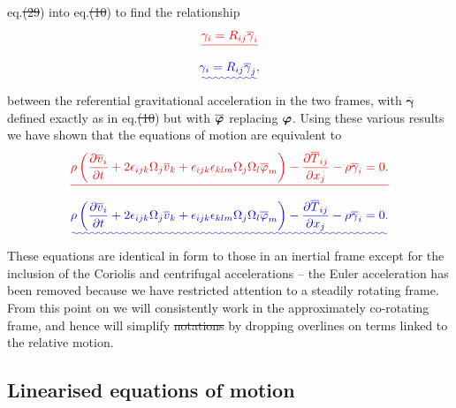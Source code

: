\documentclass[a4paper,12pt]{paper}
\providecommand{\DIFadd}[1]{{\protect\color{blue}\uwave{#1}}} %
\providecommand{\DIFdel}[1]{{\protect\color{red}\sout{#1}}}                      %
\providecommand{\DIFaddbegin}{} %
\providecommand{\DIFaddend}{} %
\providecommand{\DIFdelbegin}{} %
\providecommand{\DIFdelend}{} %
\begin{document}
eq.\DIFdelbegin \DIFdel{(29}\DIFdelend \DIFaddbegin \DIFadd{~(\ref{eq:29}}\DIFaddend ) into eq.\DIFdelbegin \DIFdel{(10}\DIFdelend \DIFaddbegin \DIFadd{~(\ref{eq:10}}\DIFaddend ) to find the relationship
\DIFdelbegin \begin{displaymath}
\DIFdel{\gamma_{i}=R_{ij}\overline{\gamma}_{i}
}\end{displaymath}%
\DIFdelend \DIFaddbegin \begin{equation}
\DIFadd{\gamma_{i}=R_{ij}\overline{\gamma}_{j},
\label{eq:39}
}\end{equation}\DIFaddend 
between the referential gravitational acceleration in the two frames, with \DIFdelbegin \DIFdel{$\overline{\boldsymbol{\gamma}}$ }\DIFdelend \DIFaddbegin \DIFadd{$\overline{\bm{\gamma}}$ }\DIFaddend defined 
exactly as in eq.\DIFdelbegin \DIFdel{(10}\DIFdelend \DIFaddbegin \DIFadd{~(\ref{eq:10}}\DIFaddend ) but with $\overline{\bm{\varphi}}$ replacing $\bm{\varphi}$. Using these various 
results we have shown that the equations of motion are equivalent to
\DIFdelbegin \begin{displaymath}
\DIFdel{\rho\left(\frac{\partial\overline{v}_{i}}{\partial t}+2\epsilon_{ijk}\Omega_{j}\overline{v}_{k}+\epsilon_{ijk}
\epsilon_{klm}\Omega_{j}\Omega_{l}\overline{\varphi}_{m}\right)-\frac{\partial\overline{T}_{ij}}{\partial x_{j}}-\rho\overline{\gamma}_{i}=0.
}\end{displaymath}%
\DIFdelend \DIFaddbegin \begin{equation}
\DIFadd{\rho\left(\frac{\partial\overline{v}_{i}}{\partial t}+2\epsilon_{ijk}\Omega_{j}\overline{v}_{k}+\epsilon_{ijk}
\epsilon_{klm}\Omega_{j}\Omega_{l}\overline{\varphi}_{m}\right)-\frac{\partial\overline{T}_{ij}}{\partial x_{j}}-\rho\overline{\gamma}_{i}=0.
\label{eq:40}
}\end{equation}\DIFaddend 
These equations are identical in form to those in an inertial frame except for the inclusion of the Coriolis and 
centrifugal accelerations -- the Euler acceleration has been removed because we have restricted attention to a 
steadily rotating frame. From this point on we will consistently work in the approximately co-rotating frame, 
and hence will simplify \DIFdelbegin \DIFdel{notations }\DIFdelend \DIFaddbegin \DIFadd{notation }\DIFaddend by dropping overlines on terms linked to the relative motion. 

\subsection*{Linearised equations of motion}
\end{document}

